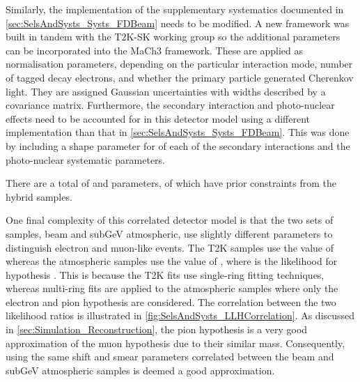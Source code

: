 Similarly, the implementation of the supplementary systematics documented in \autoref{sec:SelsAndSysts_Systs_FDBeam} needs to be modified. A new framework \cite{t2ksk-common} was built in tandem with the T2K-SK working group \cite{t2k_tn_399} so the additional parameters can be incorporated into the MaCh3 framework. These are applied as normalisation parameters, depending on the particular interaction mode, number of tagged decay electrons, and whether the primary particle generated Cherenkov light. They are assigned Gaussian uncertainties with widths described by a covariance matrix. Furthermore, the secondary interaction and photo-nuclear effects need to be accounted for in this detector model using a different implementation than that in \autoref{sec:SelsAndSysts_Systs_FDBeam}. This was done by including a shape parameter for of each of the secondary interactions and the photo-nuclear systematic parameters.

There are a total of   and  parameters, of which  have prior constraints from the hybrid  samples.

One final complexity of this correlated detector model is that the two sets of samples, beam and subGeV atmospheric, use slightly different parameters to distinguish electron and muon-like events. The T2K samples use the value of  whereas the atmospheric samples use the value of , where  is the likelihood for hypothesis . This is because the T2K fits use single-ring \fq fitting techniques, whereas multi-ring fits are applied to the atmospheric samples where only the electron and pion hypothesis are considered. The correlation between the two likelihood ratios is illustrated in \autoref{fig:SelsAndSysts_LLHCorrelation}. As discussed in \autoref{sec:Simulation_Reconstruction}, the pion hypothesis is a very good approximation of the muon hypothesis due to their similar mass. Consequently, using the same shift and smear parameters correlated between the beam and subGeV atmospheric samples is deemed a good approximation.


